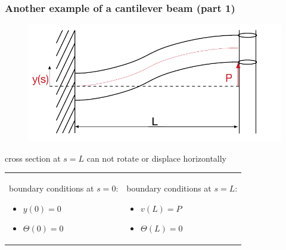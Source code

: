 \begin{frame}
  \frametitle{Another example of a cantilever beam (part 1)}
  
  \vspace{-0.7em}
  \begin{figure}
    \centering
    \includegraphics[width=16cm, keepaspectratio=true]{sections/traditional_beams/images/TimoshenkoCanitleverExample2part1}
  \end{figure}
  \vspace{-0.5em}
  cross section at $s=L$ can not rotate or displace horizontally
  \vspace{1em}
  \begin{tabularx}{\linewidth}{XX}
    {
      boundary conditions at $s=0$:
      \begin{itemize}
        \item $y(0) = 0$
        \item $\Theta(0) = 0$
      \end{itemize}
    } & {
      boundary conditions at $s=L$:
      \begin{itemize}
        \item $v(L) = P$
        \item $\Theta(L) = 0$
      \end{itemize}
    }
  \end{tabularx}
\end{frame}


